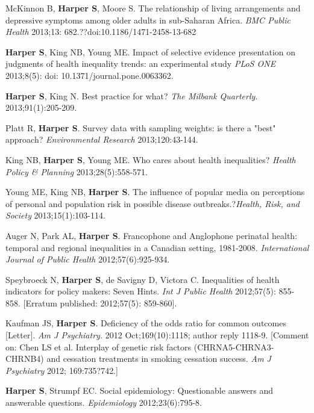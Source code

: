 \documentclass[
  letterpaper,
  DIV=11,
  numbers=noendperiod]{scrartcl}
\begin{document}
\begin{etaremune}
\item *McKinnon B, \textbf{Harper S}, Moore S. The relationship of living arrangements and depressive symptoms among older adults in sub-Saharan Africa. \emph{BMC Public Health} 2013;13: 682.??doi:10.1186/1471-2458-13-682
 
\item \textbf{Harper S}, King NB, Young ME. Impact of selective evidence presentation on judgments of health inequality trends: an experimental study \emph{PLoS ONE} 2013;8(5): doi: 10.1371/journal.pone.0063362.

\item \textbf{Harper S}, King N. Best practice for what? \emph{The Milbank Quarterly.} 2013;91(1):205-209.
 
\item Platt R, \textbf{Harper S}. Survey data with sampling weights: is there a "best" approach? \emph{Environmental Research} 2013;120:43-144.
 
\item King NB, \textbf{Harper S}, Young ME. Who cares about health inequalities? \emph{Health Policy \& Planning} 2013;28(5):558-571.
 
\item Young ME, King NB, \textbf{Harper S}. The influence of popular media on perceptions of personal and population risk in possible disease outbreaks.?\emph{Health, Risk, and Society} 2013;15(1):103-114.
 
\item Auger N, Park AL, \textbf{Harper S}. Francophone and Anglophone perinatal health: temporal and regional inequalities in a Canadian setting, 1981-2008. \emph{International Journal of Public Health} 2012;57(6):925-934.
 
\item Speybroeck N, \textbf{Harper S}, de Savigny D, Victora C. Inequalities of health indicators for policy makers: Seven Hints. \emph{Int J Public Health} 2012;57(5): 855-858. [Erratum published: 2012;57(5): 859-860].
 
\item Kaufman JS, \textbf{Harper S}. Deficiency of the odds ratio for common outcomes [Letter]. \emph{Am J Psychiatry.} 2012 Oct;169(10):1118; author reply 1118-9. [Comment on: Chen  LS et al. Interplay of genetic risk factors (CHRNA5-CHRNA3-CHRNB4) and cessation treatments in smoking cessation success.  \emph{Am J Psychiatry} 2012; 169:735?742.]
 
\item \textbf{Harper S}, Strumpf EC. Social epidemiology: Questionable answers and answerable questions. \emph{Epidemiology} 2012;23(6):795-8.
 

\end{etaremune}
\end{document}
